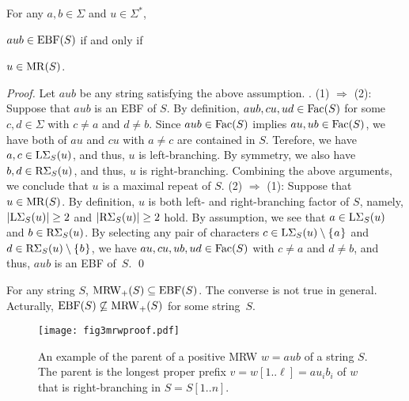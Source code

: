 \begin{lemma}
    \label{lem:characterization:ebf}
For any $a, b \in \Sigma$ and $u\in\Sigma^*$, 
\begin{enumerate*}[(1)]
\item $aub \in \EBF(S)$ if and only if 
\item $u\in\MR(S)$. 
\end{enumerate*}
\end{lemma}

  \begin{proof}
    Let $aub$ be any string satisfying the above assumption. . 
    (1) $\Rightarrow$ (2): Suppose that $aub$ is an EBF of $S$. By definition, $aub, cu, ud \in \Fac(S)$ for some $c, d \in \Sigma$ with $c \not= a$ and $d \not= b$.
    Since $aub\in \Fac(S)$ implies $au, ub\in \Fac(S)$,
    we have both of $au$ and $cu$ with $a\not=c$ are contained in $S$. Terefore, we have $a, c \in \LSigma[S](u)$, and thus, $u$ is left-branching. By symmetry, we also have $b, d \in \RSigma[S](u)$, and thus, $u$ is right-branching. Combining the above arguments, we conclude that $u$ is a maximal repeat of $S$. 
    (2) $\Rightarrow$ (1): Suppose that $u \in \MR(S)$. By definition, $u$ is both left- and right-branching factor of $S$, namely,
    $|\LSigma[S](u)| \ge 2$ and $|\RSigma[S](u)| \ge 2$ hold. By assumption, we see that $a \in \LSigma[S](u)$ and $b \in \RSigma[S](u)$. By selecting any pair of characters $c \in \LSigma[S](u)\setminus\set{a}$ and $d \in \RSigma[S](u)\setminus\set{b}$, we have $au, cu, ub, ud \in \Fac(S)$ with $c \not= a$ and $d \not= b$, and thus, $aub$ is an EBF of~$S$. \qed 
  \end{proof}

\begin{remark}
For any string $S$, $\MRW_{+}(S) \subseteq \EBF(S)$. The converse is not true in general. Acturally, $\EBF(S) \not\subseteq \MRW_{+}(S)$ for some string~$S$. 
\end{remark}

\begin{figure}[t]
\centering  
\texttt{[image: fig3mrwproof.pdf]}
\vspace{.5\baselineskip}
\caption{
  An example of the parent of a positive MRW $w = aub$ of a string $S$.
  The parent is the longest proper prefix $v = w[1..\ell] = a u_i b_i$ of $w$ that is right-branching in $S = S[1..n]$. 
}\label{fig:mrw:parent}
\end{figure}

